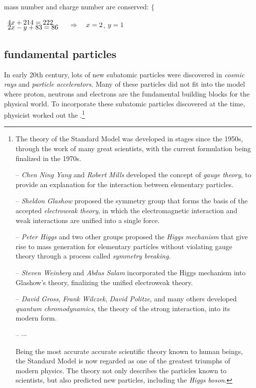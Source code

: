 \eqyskip mass number and charge number are conserved: $\Bigg\{$

\vspace*{-1.58\baselineskip}\hspace*{218pt} $\begin{array}{l}
4x + 214 = 222\\[-5pt]
2x - y + 83 = 86
\end{array} \quad \Rightarrow \quad x = 2$, $y=1$ \eoe



\subsection{fundamental particles}

In early 20th century, lots of new subatomic particles were discovered in \emph{cosmic rays} and \emph{particle accelerators}. Many of these particles did not fit into the model where proton, neutrons and electrons are the fundamental building blocks for the physical world. To incorporate these subatomic particles discovered at the time, physicist worked out the .\footnote{The theory of the Standard Model was developed in stages since the 1950s, through the work of many great scientists, with the current formulation being finalized in the 1970s.
	\begin{compactitem}
		\item[--] \emph{Chen Ning Yang} and \emph{Robert Mills} developed the concept of \emph{gauge theory}, to provide an explanation for the interaction between elementary particles.
		
		\item[--] \emph{Sheldon Glashow} proposed the symmetry group that forms the basis of the accepted \emph{electroweak theory}, in which the electromagnetic interaction and weak interactions are unified into a single force.
		
		\item[--] \emph{Peter Higgs} and two other groups proposed the \emph{Higgs mechanism} that give rise to mass generation for elementary particles without violating gauge theory through a process called \emph{symmetry breaking}.
		
		\item[--] \emph{Steven Weinberg} and \emph{Abdus Salam} incorporated the Higgs mechanism into Glashow's theory, finalizing the unified electroweak theory.
		
		\item[--] \emph{David Gross}, \emph{Frank Wilczek}, \emph{David Politze}, and many others developed \emph{quantum chromodynamics}, the theory of the strong interaction, into its modern form.
		
		\item[--] $\cdots$
	\end{compactitem}

Being the most accurate accurate scientific theory known to human beings, the Standard Model is now regarded as one of the greatest triumphs of modern physics. The theory not only describes the particles known to scientists, but also predicted new particles, including the \emph{Higgs boson}. }


